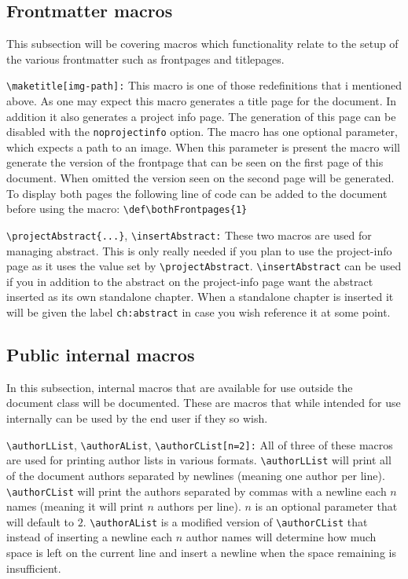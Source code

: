 \documentclass[11pt]{../aau-report}
\newcommand\mn[1]{\texttt{\textbackslash{}#1}}
\begin{document}
\subsection{Frontmatter macros}
This subsection will be covering macros which functionality relate to the setup of the various frontmatter such as frontpages and titlepages.

\mn{maketitle[img-path]:} This macro is one of those redefinitions that i mentioned above. As one may expect this macro generates a title page for the document. In addition it also generates a project info page. The generation of this page can be disabled with the \texttt{noprojectinfo} option.
The macro has one optional parameter, which expects a path to an image. When this parameter is present the macro will generate the version of the frontpage that can be seen on the first page of this document. When omitted the version seen on the second page will be generated.
To display both pages the following line of code can be added to the document before using the macro: \verb|\def\bothFrontpages{1}|

\mn{projectAbstract\{...\}}, \mn{insertAbstract:}  These two macros are used for managing abstract. This is only really needed if you plan to use the project-info page as it uses the value set by \mn{projectAbstract}. \mn{insertAbstract} can be used if you in addition to the abstract on the project-info page want the abstract inserted as its own standalone chapter. When a standalone chapter is inserted it will be given the label \texttt{ch:abstract} in case you wish reference it at some point.

\subsection{Public internal macros}
In this subsection, internal macros that are available for use outside the document class will be documented. These are macros that while intended for use internally can be used by the end user if they so wish.

\mn{authorLList}, \mn{authorAList}, \mn{authorCList[n=2]:} All of three of these macros are used for printing author lists in various formats. \mn{authorLList} will print all of the document authors separated by newlines (meaning one author per line). \mn{authorCList} will print the authors separated by commas with a newline each $n$ names (meaning it will print $n$ authors per line). $n$ is an optional parameter that will default to $2$. \mn{authorAList} is a modified version of \mn{authorCList} that instead of inserting a newline each $n$ author names will determine how much space is left on the current line and insert a newline when the space remaining is insufficient.
\end{document}
